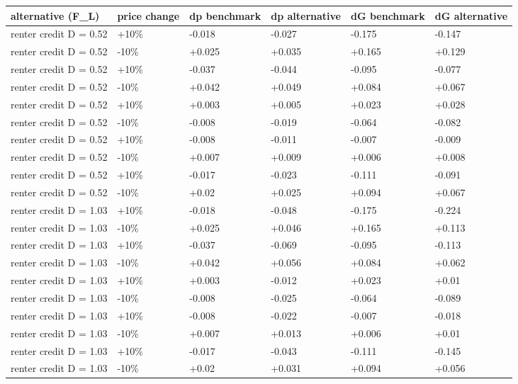 \begingroup\small
\setlength{\tabcolsep}{3pt}
\renewcommand{\arraystretch}{1.04}
\begin{tabularx}{\linewidth}{XXXXXX}
\toprule
alternative (F\_L) & price change & dp benchmark & dp alternative & dG benchmark & dG alternative \\
\midrule
renter credit D = 0.52 & +10\% & -0.018 & -0.027 & -0.175 & -0.147 \\
renter credit D = 0.52 & -10\% & +0.025 & +0.035 & +0.165 & +0.129 \\
renter credit D = 0.52 & +10\% & -0.037 & -0.044 & -0.095 & -0.077 \\
renter credit D = 0.52 & -10\% & +0.042 & +0.049 & +0.084 & +0.067 \\
renter credit D = 0.52 & +10\% & +0.003 & +0.005 & +0.023 & +0.028 \\
renter credit D = 0.52 & -10\% & -0.008 & -0.019 & -0.064 & -0.082 \\
renter credit D = 0.52 & +10\% & -0.008 & -0.011 & -0.007 & -0.009 \\
renter credit D = 0.52 & -10\% & +0.007 & +0.009 & +0.006 & +0.008 \\
renter credit D = 0.52 & +10\% & -0.017 & -0.023 & -0.111 & -0.091 \\
renter credit D = 0.52 & -10\% & +0.02 & +0.025 & +0.094 & +0.067 \\
renter credit D = 1.03 & +10\% & -0.018 & -0.048 & -0.175 & -0.224 \\
renter credit D = 1.03 & -10\% & +0.025 & +0.046 & +0.165 & +0.113 \\
renter credit D = 1.03 & +10\% & -0.037 & -0.069 & -0.095 & -0.113 \\
renter credit D = 1.03 & -10\% & +0.042 & +0.056 & +0.084 & +0.062 \\
renter credit D = 1.03 & +10\% & +0.003 & -0.012 & +0.023 & +0.01 \\
renter credit D = 1.03 & -10\% & -0.008 & -0.025 & -0.064 & -0.089 \\
renter credit D = 1.03 & +10\% & -0.008 & -0.022 & -0.007 & -0.018 \\
renter credit D = 1.03 & -10\% & +0.007 & +0.013 & +0.006 & +0.01 \\
renter credit D = 1.03 & +10\% & -0.017 & -0.043 & -0.111 & -0.145 \\
renter credit D = 1.03 & -10\% & +0.02 & +0.031 & +0.094 & +0.056 \\
\bottomrule
\end{tabularx}
\endgroup
